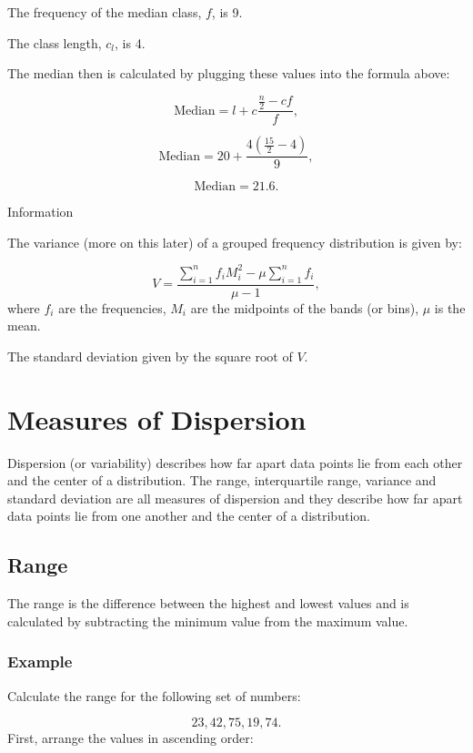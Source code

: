 \documentclass[
]{book}
\begin{document}
The frequency of the median class, \(f\), is 9.

The class length, \(c_l\), is 4.

The median then is calculated by plugging these values into the formula above:

\[\textrm{Median} = l + c \frac{\frac{n}{2}-cf}{f},\]

\[\textrm{Median} = 20 + \frac{4(\frac{15}{2}-4)}{9}, \]

\[\textrm{Median} =21.6.\]

Information

The variance (more on this later) of a grouped frequency distribution is given by:

\[ V=\frac{\sum_{i=1}^n f_i M_i^2 - \mu \sum_{i=1}^n f_i}{\mu -1},
 \]
where \(f_i\) are the frequencies, \(M_i\) are the midpoints of the bands (or bins), \(\mu\) is the mean.

The standard deviation given by the square root of \(V\).

\hypertarget{measures-of-dispersion}{%
\section{Measures of Dispersion}\label{measures-of-dispersion}}

Dispersion (or variability) describes how far apart data points lie from each other and the center of a distribution. The range, interquartile range, variance and standard deviation are all measures of dispersion and they describe how far apart data points lie from one another and the center of a distribution.

\hypertarget{range}{%
\subsection{Range}\label{range}}

The range is the difference between the highest and lowest values and is calculated by subtracting the minimum value from the maximum value.

\hypertarget{example-7}{%
\subsubsection{Example}\label{example-7}}

Calculate the range for the following set of numbers:

\[ 23, 42, 75, 19, 74. \]
First, arrange the values in ascending order:
\end{document}
